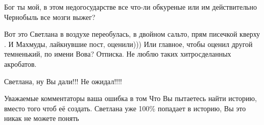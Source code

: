 \begin{itemize}
 
Бог ты мой, в этом недогосударстве все что-ли обкуреные или им действительно Чернобыль все мозги выжег?


Вот это Светлана в воздухе переобулась, в двойном сальто, прям писечкой кверху
. И Махмуды, лайкнувшие пост, оценили))) Или главное, чтобы оценил другой
темненький, по имени Вова? Отписка. Не люблю таких хитросделанных акробатов.


 

Светлана, ну Вы дали!!! Не ожидал!!!!


 

Уважаемые комментаторы ваша ошибка в том Что Вы пытаетесь найти историю, вместо
того чтоб её создать. Светлана уже 100\% попадает в историю, Вы это никак не
можете понять

\end{itemize}

